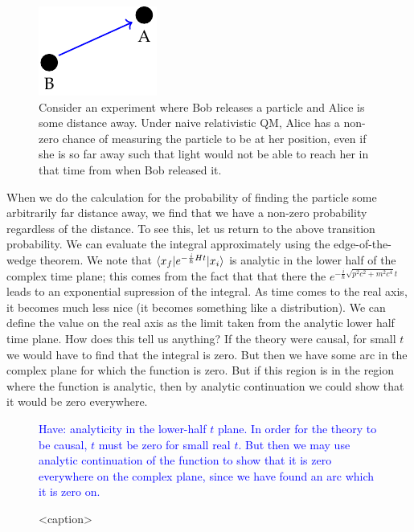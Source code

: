 \begin{figure}[htbp]
    \centering
    \includegraphics[]{Images/fig-RQMABcartoon.pdf}

    \caption{Consider an experiment where Bob releases a particle and Alice is some distance away. Under naive relativistic QM, Alice has a non-zero chance of measuring the particle to be at her position, even if she is so far away such that light would not be able to reach her in that time from when Bob released it.}
    \label{fig-RQMABcartoon}
\end{figure}
When we do the calculation for the probability of finding the particle some arbitrarily far distance away, we find that we have a non-zero probability regardless of the distance. To see this, let us return to the above transition probability. We can evaluate the integral approximately using the edge-of-the-wedge theorem. We note that $\langle x_f \rvert e^{-\frac{i}{\hbar}Ht}\lvert x_i \rangle$ is analytic in the lower half of the complex time plane; this comes from the fact that that there the $ e^{-\frac{i}{\hbar}\sqrt{p^2c^2 + m^2c^4}t}$ leads to an exponential supression of the integral. As time comes to the real axis, it becomes much less nice (it becomes something like a distribution). We can define the value on the real axis as the limit taken from the analytic lower half time plane. How does this tell us anything? If the theory were causal, for small $t$ we would have to find that the integral is zero. But then we have some arc in the complex plane for which the function is zero. But if this region is in the region where the function is analytic, then by analytic continuation we could show that it would be zero everywhere. 

\begin{figure}[htbp]
    \centering
    \textcolor{blue}{Have: analyticity in the lower-half $t$ plane. In order for the theory to be causal, $t$ must be zero for small real $t$. But then we may use analytic continuation of the function to show that it is zero everywhere on the complex plane, since we have found an arc which it is zero on.}
    \caption{<caption>}
    \label{<label>}
\end{figure}


